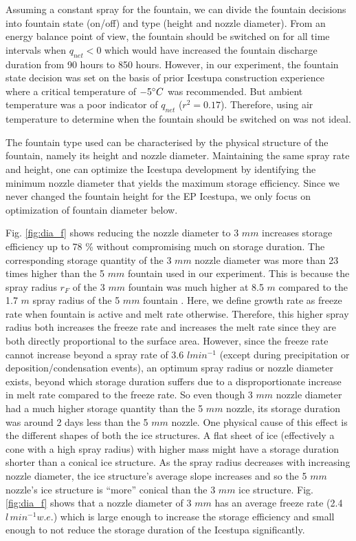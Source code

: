 \documentclass[utf8]{frontiersSCNS} %
\begin{document}
Assuming a constant spray for the fountain, we can divide the fountain decisions into fountain state (on/off) and type
(height and nozzle diameter).  From an energy balance point of view, the fountain should be switched on for all time
intervals when $q_{net} < 0$ which would have increased the fountain discharge duration from 90 hours to 850 hours.
However, in our experiment, the fountain state decision was set on the basis of prior Icestupa construction
experience where a critical temperature of $-5 \degree C$ was recommended. But ambient temperature was a poor
indicator of $q_{net}$ ($r^2 = 0.17$).  Therefore, using air temperature to determine when the fountain should be
switched on was not ideal. 

The fountain type used can be characterised by the physical structure of the fountain, namely its height and nozzle
diameter. Maintaining the same spray rate and height, one can optimize the Icestupa development by identifying the
minimum nozzle diameter that yields the maximum storage efficiency. Since we never changed the fountain height for the
EP Icestupa, we only focus on optimization of fountain diameter below.

Fig. \ref{fig:dia_f} shows reducing the nozzle diameter to 3 $mm$ increases storage efficiency up to 78 \% without
compromising much on storage duration.  The corresponding storage quantity of the 3 $mm$ nozzle diameter was more than
23 times higher than the 5 $mm$ fountain used in our experiment. This is because the spray radius $r_F$ of the 3 $mm$
fountain was much higher at 8.5 $m$ compared to the 1.7 $m$ spray radius of the 5 $mm$ fountain . Here, we define
growth rate as freeze rate when fountain is active and melt rate otherwise. Therefore, this higher spray radius both
increases the freeze rate  and increases the melt rate since they are both directly proportional to the surface area.
However, since the freeze rate cannot increase beyond a spray rate of 3.6 $l min^{-1}$ (except during precipitation or
deposition/condensation events), an optimum spray radius or nozzle diameter exists, beyond which storage duration
suffers due to a disproportionate increase in melt rate compared to the freeze rate. So even though 3 $mm$ nozzle
diameter had a much higher storage quantity than the 5 $mm$ nozzle, its storage duration was around 2 days less than
the 5 $mm$ nozzle. One physical cause of this effect is the different shapes of both the ice structures. A flat sheet
of ice (effectively a cone with a high spray radius) with higher mass might have a storage duration shorter than a
conical ice structure. As the spray radius decreases with increasing nozzle diameter, the ice structure’s average
slope increases and so the 5 $mm$ nozzle's ice structure is ``more'' conical than the 3 $mm$ ice structure. Fig.
\ref{fig:dia_f} shows that a nozzle diameter of 3 $mm$ has an average freeze rate (2.4 $l \,min^{-1} w.e.$) which is
large enough to increase the storage efficiency and small enough to not reduce the storage duration of the Icestupa
significantly.
\end{document}
